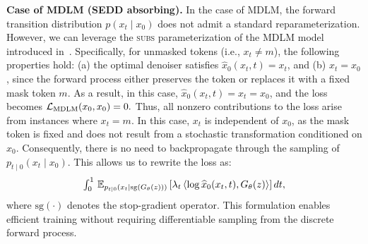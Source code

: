 \textbf{Case of MDLM (SEDD absorbing).} In the case of MDLM, the forward transition distribution $p(x_t \mid x_0)$ does not admit a standard reparameterization. However, we can leverage the \textsc{subs} parameterization of the MDLM model introduced in~\citep[see Section 3.2.3]{sahoo2024simple}. Specifically, for unmasked tokens (i.e., $x_t \neq m$), the following properties hold: (a) the optimal denoiser satisfies $\widehat{x}_0(x_t, t) = x_t$, and (b) $x_t = x_0$, since the forward process either preserves the token or replaces it with a fixed mask token $m$. As a result, in this case, $\widehat{x}_0(x_t, t) = x_t = x_0$, and the loss becomes $\mathcal{L}_{\text{MDLM}}(x_0, x_0) = 0.$
Thus, all nonzero contributions to the loss arise from instances where $x_t = m$. In this case, $x_t$ is independent of $x_0$, as the mask token is fixed and does not result from a stochastic transformation conditioned on $x_0$. Consequently, there is no need to backpropagate through the sampling of $p_{t \mid 0}(x_t \mid x_0)$. This allows us to rewrite the loss as:
\begin{gather}
  \textstyle \int_0^1 \, \mathbb{E}_{p_{t \mid 0}(x_t \mid \text{sg}(G_{\theta}(z)))} \left[
  \lambda_t \, \langle \log \widehat{x}_0(x_t, t), G_{\theta}(z) \rangle
  \right] dt,
  \nonumber
\end{gather}
where $\text{sg}(\cdot)$ denotes the stop-gradient operator. This formulation enables efficient training without requiring differentiable sampling from the discrete forward process.






